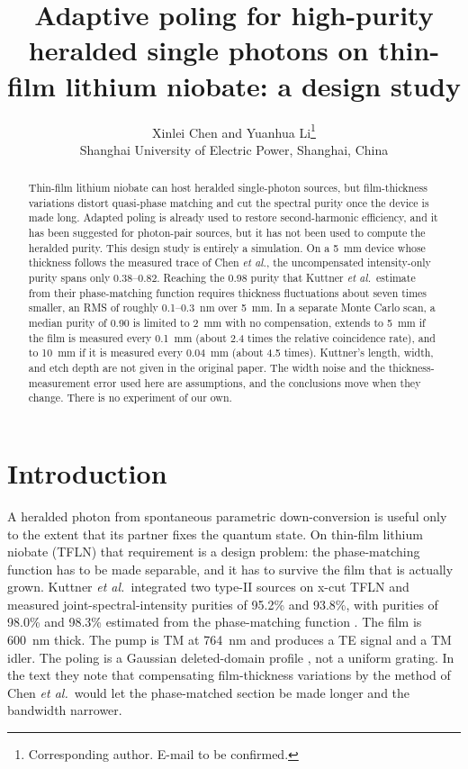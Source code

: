 \documentclass[11pt,a4paper]{article}
\title{Adaptive poling for high-purity heralded single photons on thin-film lithium niobate: a design study}
\author{%
Xinlei Chen and Yuanhua Li\thanks{Corresponding author. E-mail to be confirmed.}\\
Shanghai University of Electric Power, Shanghai, China%
}
\date{}
\begin{document}
\maketitle

\begin{abstract}
Thin-film lithium niobate can host heralded single-photon sources, but film-thickness variations distort quasi-phase matching and cut the spectral purity once the device is made long.
Adapted poling is already used to restore second-harmonic efficiency, and it has been suggested for photon-pair sources, but it has not been used to compute the heralded purity.
This design study is entirely a simulation.
On a 5~mm device whose thickness follows the measured trace of Chen \emph{et al.}, the uncompensated intensity-only purity spans only 0.38--0.82.
Reaching the 0.98 purity that Kuttner \emph{et al.}\ estimate from their phase-matching function requires thickness fluctuations about seven times smaller, an RMS of roughly 0.1--0.3~nm over 5~mm.
In a separate Monte Carlo scan, a median purity of 0.90 is limited to 2~mm with no compensation, extends to 5~mm if the film is measured every 0.1~mm (about 2.4 times the relative coincidence rate), and to 10~mm if it is measured every 0.04~mm (about 4.5 times).
Kuttner's length, width, and etch depth are not given in the original paper.
The width noise and the thickness-measurement error used here are assumptions, and the conclusions move when they change.
There is no experiment of our own.
\end{abstract}

\section{Introduction}
A heralded photon from spontaneous parametric down-conversion is useful only to the extent that its partner fixes the quantum state.
On thin-film lithium niobate (TFLN) that requirement is a design problem: the phase-matching function has to be made separable, and it has to survive the film that is actually grown.
Kuttner \emph{et al.}\ integrated two type-II sources on x-cut TFLN and measured joint-spectral-intensity purities of 95.2\% and 93.8\%, with purities of 98.0\% and 98.3\% estimated from the phase-matching function \cite{Kuttner2026}.
The film is 600~nm thick.
The pump is TM at 764~nm and produces a TE signal and a TM idler.
The poling is a Gaussian deleted-domain profile \cite{Tambasco2016,Kuttner2026}, not a uniform grating.
In the text they note that compensating film-thickness variations by the method of Chen \emph{et al.}\ would let the phase-matched section be made longer and the bandwidth narrower.
\end{document}
